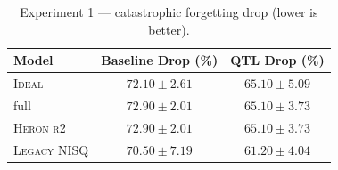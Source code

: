 \begin{table}[ht]
\centering
\caption{Experiment 1 — catastrophic forgetting drop (lower is better).}
\label{tab:forgetting}
\begin{tabular}{lcc}
\toprule
\textbf{Model} & Baseline Drop (\%) & QTL Drop (\%) \\
\midrule
\textsc{Ideal} & $72.10 \pm 2.61$ & $65.10 \pm 5.09$ \\
full & $72.90 \pm 2.01$ & $65.10 \pm 3.73$ \\
\textsc{Heron r2} & $72.90 \pm 2.01$ & $65.10 \pm 3.73$ \\
\textsc{Legacy NISQ} & $70.50 \pm 7.19$ & $61.20 \pm 4.04$ \\
\bottomrule
\end{tabular}
\end{table}
